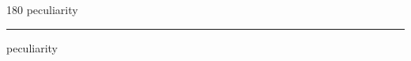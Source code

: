 
\begin{frame}
\begin{center}
\begin{turn}{180}
{\fontsize{2.5cm}{1em}\selectfont peculiarity}
\end{turn}
\vspace{1em}\par  
\hrule
\vspace{1em}\par  
{\fontsize{2.5cm}{1em}\selectfont peculiarity}
\end{center}
\end{frame}
